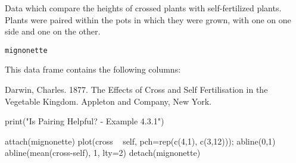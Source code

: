 \begin{Description}\relax
Data which compare the heights of crossed plants with
self-fertilized plants.  Plants were paired within the
pots in which they were grown, with one on one side and
one on the other.
\end{Description}
\begin{Usage}
\begin{verbatim}mignonette\end{verbatim}
\end{Usage}
\begin{Format}\relax
This data frame contains the following columns:
\end{Format}
\begin{Source}\relax
Darwin, Charles. 1877.  The Effects of Cross and Self
Fertilisation in the Vegetable Kingdom.  Appleton and Company, New
York.
\end{Source}
\begin{Examples}
\begin{ExampleCode}
print("Is Pairing Helpful? - Example 4.3.1")

attach(mignonette)
plot(cross ~ self, pch=rep(c(4,1), c(3,12))); abline(0,1) 
abline(mean(cross-self), 1, lty=2)
detach(mignonette)
\end{ExampleCode}
\end{Examples}

